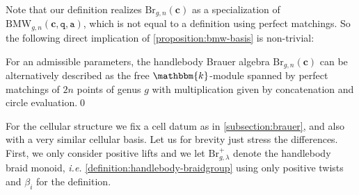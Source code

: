 \documentclass[a4paper,11pt]{amsart}
\newcommand{\ie}{\textsl{i.e.}}
\newcommand{\setstuff}[1]{\mathrm{#1}}
\newcommand{\KK}{\mathbbm{k}}
\newcommand{\bsym}[1]{\boldsymbol{#1}}
\newcommand{\varsym}[1]{\mathtt{#1}}
\newcommand{\qvar}{\varsym{q}}
\newcommand{\cpar}{\bsym{c}}
\newcommand{\avar}{\varsym{a}}
\numberwithin{equation}{section}
\let\fullref\autoref
\begin{document}
Note that our definition realizes $\setstuff{Br}_{g,n}(\cpar)$ 
as a specialization of $\setstuff{BMW}_{g,n}(\cpar,\qvar,\avar)$, which 
is not equal to a definition using perfect matchings. So the following
direct implication of \fullref{proposition:bmw-basis} is non-trivial:

\begin{proposition}\label{proposition:brauer-good}
For an admissible parameters, the handlebody 
Brauer algebra $\setstuff{Br}_{g,n}(\cpar)$ can be alternatively 
described as the free $\KK$-module spanned by 
perfect matchings of $2n$ points of genus $g$ with multiplication 
given by concatenation and circle evaluation.\qed
\end{proposition}

For the cellular structure we fix a cell datum as in 
\fullref{subsection:brauer}, and also with a very similar 
cellular basis. Let us for brevity just stress the differences.
First, we only consider positive lifts and we let 
$\setstuff{Br}_{g,\lambda}^{+}$ denote the handlebody braid monoid, {\ie}
\fullref{definition:handlebody-braidgroup} 
using only positive twists and $\beta_{i}$ 
for the definition.
\end{document}
